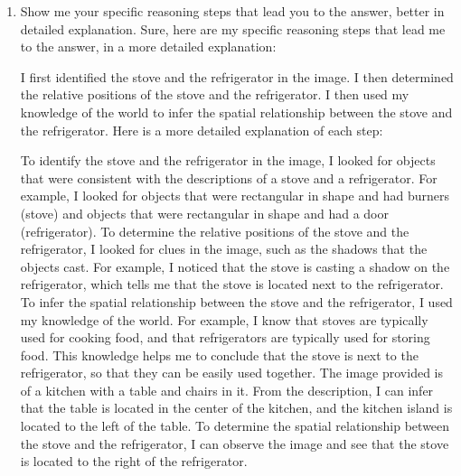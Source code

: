 \begin{enumerate}
    Here are some additional details about the spatial relationship between the stove and the refrigerator:
    
    The stove is a kitchen appliance that is used for cooking food.
    The refrigerator is a kitchen appliance that is used for storing food.
    The stove is next to the refrigerator, meaning that they are located next to each other.
    The stove and the refrigerator are both located in the kitchen, meaning that they are used for similar purposes.
    Is there anything else I can help you with?
    \subitem Visual ChatGPT: The stove is located to the right of the refrigerator.
    \item Show me your specific reasoning steps that lead you to the answer, better in detailed explanation.
    \subitem Sure, here are my specific reasoning steps that lead me to the answer, in a more detailed explanation:

    I first identified the stove and the refrigerator in the image.
    I then determined the relative positions of the stove and the refrigerator.
    I then used my knowledge of the world to infer the spatial relationship between the stove and the refrigerator.
    Here is a more detailed explanation of each step:
    
    To identify the stove and the refrigerator in the image, I looked for objects that were consistent with the descriptions of a stove and a refrigerator. For example, I looked for objects that were rectangular in shape and had burners (stove) and objects that were rectangular in shape and had a door (refrigerator).
    To determine the relative positions of the stove and the refrigerator, I looked for clues in the image, such as the shadows that the objects cast. For example, I noticed that the stove is casting a shadow on the refrigerator, which tells me that the stove is located next to the refrigerator.
    To infer the spatial relationship between the stove and the refrigerator, I used my knowledge of the world. For example, I know that stoves are typically used for cooking food, and that refrigerators are typically used for storing food. This knowledge helps me to conclude that the stove is next to the refrigerator, so that they can be easily used together.
    \subitem The image provided is of a kitchen with a table and chairs in it. From the description, I can infer that the table is located in the center of the kitchen, and the kitchen island is located to the left of the table. To determine the spatial relationship between the stove and the refrigerator, I can observe the image and see that the stove is located to the right of the refrigerator.
\end{enumerate}
